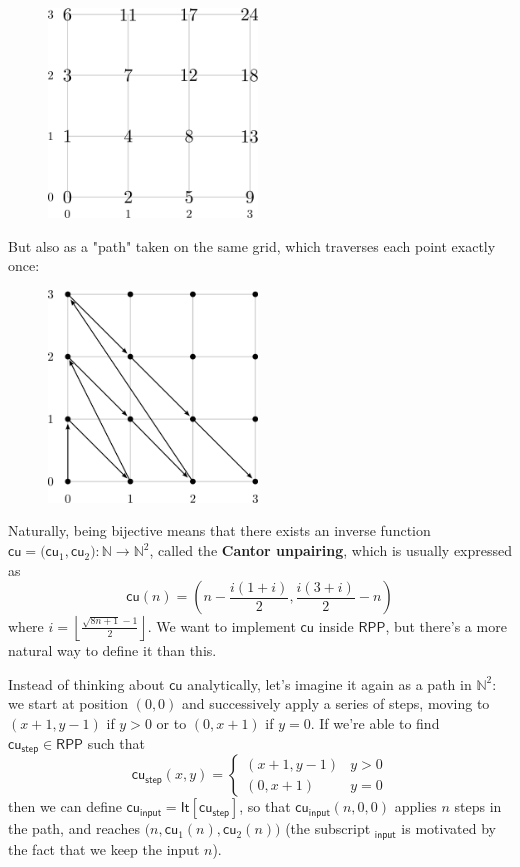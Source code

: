 \documentclass[oneside]{book}
\theoremstyle{definition}
\theoremstyle{remark}
\theoremstyle{plain}
\newcommand{\NN}{\mathbb{N}}
\newcommand{\RPP}{\mathsf{RPP}}
\newcommand{\rppIt}{\mathsf{It}}
\newcommand{\rppcu}{\mathsf{cu}}
\newcommand{\rppcui}{\mathsf{cu_{input}}}
\newcommand{\rppcustep}{\mathsf{cu_{step}}}
\begin{document}
\begin{figure}[H]
  \centering
  \includegraphics[width=15em]{Immagini/cp.png}
\end{figure}

But also as a "path" taken on the same grid, which traverses each point exactly once:

\begin{figure}[H]
  \centering
  \includegraphics[width=15em]{Immagini/cammino.png}
\end{figure}

Naturally, being bijective means that there exists an inverse function $\rppcu = \big( \rppcu_1, \rppcu_2 \big) : \NN \to \NN^2$,
called the \textbf{Cantor unpairing}, which is usually expressed as
\[ \rppcu(n) = \left( n - \frac{i(1+i)}{2}, \frac{i(3+i)}{2} - n \right) \]
where $i = \left\lfloor \frac{\sqrt{8n + 1} - 1}{2} \right\rfloor $.
We want to implement $\rppcu$ inside $\RPP$, but there's a more natural way to define it than this.

Instead of thinking about $\rppcu$ analytically, let's imagine it again as a path in $\NN^2$:
we start at position $(0, 0)$ and successively apply a series of steps,
moving to $(x+1,y-1)$ if $y > 0$ or to $(0, x+1)$ if $y = 0$.
If we're able to find $\rppcustep \in \RPP$ such that
\[ \rppcustep(x,y) = \begin{cases} (x+1,y-1) &  y > 0 \\
                                   (0, x+1) &   y = 0 \end{cases} \]
then we can define $\rppcui = \rppIt[\rppcustep]$, so that $\rppcui(n, 0, 0)$ applies $n$ steps in the path, and reaches $\big( n, \rppcu_1(n), \rppcu_2(n) \big)$
(the subscript $\mathsf{_{input}}$ is motivated by the fact that we keep the input $n$).
\end{document}
